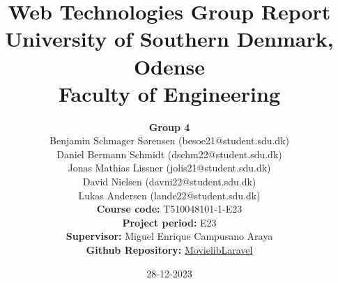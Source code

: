 


\title{\vspace*{-2cm}\textbf{
             Web Technologies Group Report}\vspace*{0.5em} \\
      University of Southern Denmark, Odense \vspace*{0.5em}\\
     Faculty of Engineering}
\date{{28-12-2023}\vspace*{16em}}


\maketitle

\begin{center}
    \author{\large \textbf{Group 4}\\\vspace*{3mm}
        \vspace*{3mm}
        \large Benjamin Schmager Sørensen (besoe21@student.sdu.dk)\\
        \vspace*{3mm}
        \large Daniel Bermann Schmidt (dschm22@student.sdu.dk)\\
        \vspace*{3mm}
        \large Jonas Mathias Lissner (jolis21@student.sdu.dk)\\
        \vspace*{3mm}
        \large David Nielsen (davni22@student.sdu.dk)\\
        \vspace*{3mm}
        \large  Lukas Andersen (lande22@student.sdu.dk)\\
        \vspace*{3mm}\vspace*{3mm}
        \large \textbf{Course code:} T510048101-1-E23\vspace*{1em}\\
        \large \textbf{Project period:} E23\vspace*{1em}\\
        \large \textbf{Supervisor:} Miguel Enrique Campusano Araya\vspace*{1em}\\
        \large \textbf{Github Repository:} \href{https://github.com/Kururururururururu/MovielibLaravel.git}{MovielibLaravel}\vspace*{1em}\\
    }
\end{center}

\maketitle


\thispagestyle{empty}
\clearpage
{}